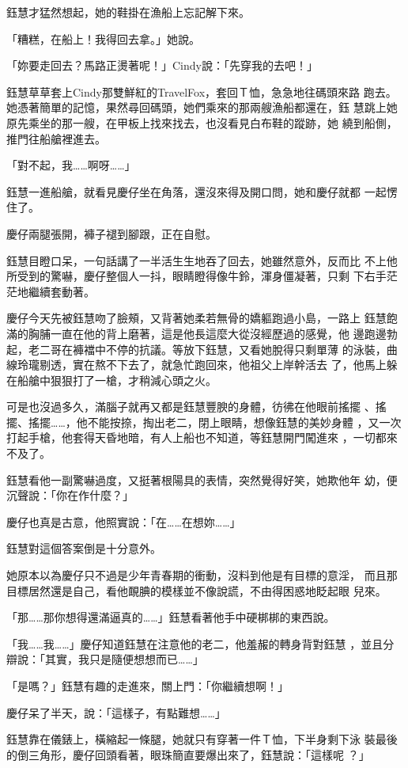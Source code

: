 鈺慧才猛然想起，她的鞋掛在漁船上忘記解下來。

「糟糕，在船上！我得回去拿。」她說。

「妳要走回去？馬路正燙著呢！」Cindy說：「先穿我的去吧！」

鈺慧草草套上Cindy那雙鮮紅的TravelFox，套回Ｔ恤，急急地往碼頭來路
跑去。她憑著簡單的記憶，果然尋回碼頭，她們乘來的那兩艘漁船都還在，鈺
慧跳上她原先乘坐的那一艘，在甲板上找來找去，也沒看見白布鞋的蹤跡，她
繞到船側，推門往船艙裡進去。

「對不起，我……啊呀……」

鈺慧一進船艙，就看見慶仔坐在角落，還沒來得及開口問，她和慶仔就都
一起愣住了。

慶仔兩腿張開，褲子褪到腳跟，正在自慰。

鈺慧目瞪口呆，一句話講了一半活生生地吞了回去，她雖然意外，反而比
不上他所受到的驚嚇，慶仔整個人一抖，眼睛瞪得像牛鈴，渾身僵凝著，只剩
下右手茫茫地繼續套動著。

慶仔今天先被鈺慧吻了臉頰，又背著她柔若無骨的嬌軀跑過小島，一路上
鈺慧飽滿的胸脯一直在他的背上磨著，這是他長這麼大從沒經歷過的感覺，他
邊跑邊勃起，老二哥在褲襠中不停的抗議。等放下鈺慧，又看她脫得只剩單薄
的泳裝，曲線玲瓏剔透，實在熬不下去了，就急忙跑回來，他祖父上岸幹活去
了，他馬上躲在船艙中狠狠打了一槍，才稍減心頭之火。

可是也沒過多久，滿腦子就再又都是鈺慧豐腴的身體，彷彿在他眼前搖擺
、搖擺、搖擺……，他不能按捺，掏出老二，閉上眼睛，想像鈺慧的美妙身體
，又一次打起手槍，他套得天昏地暗，有人上船也不知道，等鈺慧開門闖進來
，一切都來不及了。

鈺慧看他一副驚嚇過度，又挺著根陽具的表情，突然覺得好笑，她欺他年
幼，便沉聲說：「你在作什麼？」

慶仔也真是古意，他照實說：「在……在想妳……」

鈺慧對這個答案倒是十分意外。

她原本以為慶仔只不過是少年青春期的衝動，沒料到他是有目標的意淫，
而且那目標居然還是自己，看他靦腆的模樣並不像說謊，不由得困惑地眨起眼
兒來。

「那……那你想得還滿逼真的……」鈺慧看著他手中硬梆梆的東西說。

「我……我……」慶仔知道鈺慧在注意他的老二，他羞赧的轉身背對鈺慧
，並且分辯說：「其實，我只是隨便想想而已……」

「是嗎？」鈺慧有趣的走進來，關上門：「你繼續想啊！」

慶仔呆了半天，說：「這樣子，有點難想……」

鈺慧靠在儀錶上，橫縮起一條腿，她就只有穿著一件Ｔ恤，下半身剩下泳
裝最後的倒三角形，慶仔回頭看著，眼珠簡直要爆出來了，鈺慧說：「這樣呢
？」

